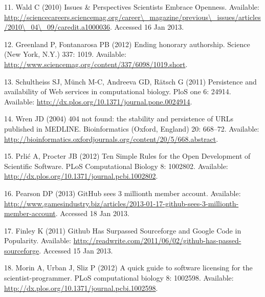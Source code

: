 \documentclass[]{article}
\begin{document}
11. Wald C (2010) Issues \& Perspectives Scientists Embrace Openness.
Available:
\href{http://sciencecareers.sciencemag.org/career\textbackslash{}\_magazine/previous\textbackslash{}\_issues/articles/2010\textbackslash{}\_04\textbackslash{}\_09/caredit.a1000036}{http://sciencecareers.sciencemag.org/career\textbackslash{}\_magazine/previous\textbackslash{}\_issues/articles/2010\textbackslash{}\_04\textbackslash{}\_09/caredit.a1000036}.
Accessed 16 Jan 2013.

12. Greenland P, Fontanarosa PB (2012) Ending honorary authorship.
Science (New York, N.Y.) 337: 1019. Available:
\href{http://www.sciencemag.org/content/337/6098/1019.short}{http://www.sciencemag.org/content/337/6098/1019.short}.

13. Schultheiss SJ, Münch M-C, Andreeva GD, Rätsch G (2011) Persistence
and availability of Web services in computational biology. PloS one 6:
24914. Available:
\href{http://dx.plos.org/10.1371/journal.pone.0024914}{http://dx.plos.org/10.1371/journal.pone.0024914}.

14. Wren JD (2004) 404 not found: the stability and persistence of URLs
published in MEDLINE. Bioinformatics (Oxford, England) 20: 668--72.
Available:
\href{http://bioinformatics.oxfordjournals.org/content/20/5/668.abstract}{http://bioinformatics.oxfordjournals.org/content/20/5/668.abstract}.

15. Prlić A, Procter JB (2012) Ten Simple Rules for the Open Development
of Scientific Software. PLoS Computational Biology 8: 1002802.
Available:
\href{http://dx.plos.org/10.1371/journal.pcbi.1002802}{http://dx.plos.org/10.1371/journal.pcbi.1002802}.

16. Pearson DP (2013) GitHub sees 3 millionth member account. Available:
\href{http://www.gamesindustry.biz/articles/2013-01-17-github-sees-3-millionth-member-account}{http://www.gamesindustry.biz/articles/2013-01-17-github-sees-3-millionth-member-account}.
Accessed 18 Jan 2013.

17. Finley K (2011) Github Has Surpassed Sourceforge and Google Code in
Popularity. Available:
\href{http://readwrite.com/2011/06/02/github-has-passed-sourceforge}{http://readwrite.com/2011/06/02/github-has-passed-sourceforge}.
Accessed 15 Jan 2013.

18. Morin A, Urban J, Sliz P (2012) A quick guide to software licensing
for the scientist-programmer. PLoS computational biology 8: 1002598.
Available:
\href{http://dx.plos.org/10.1371/journal.pcbi.1002598}{http://dx.plos.org/10.1371/journal.pcbi.1002598}.
\end{document}
